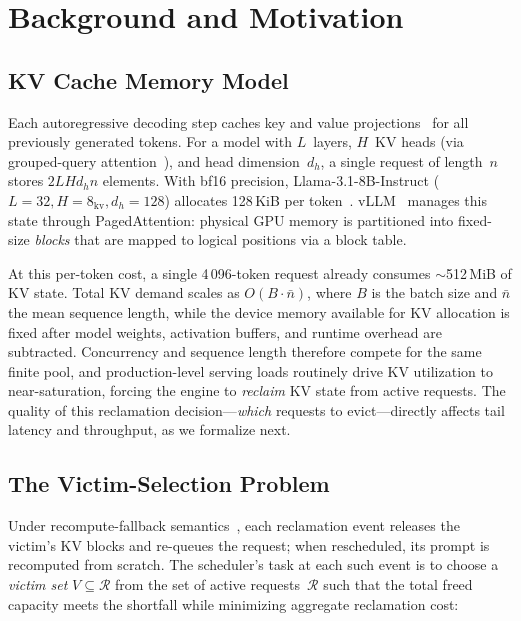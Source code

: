 \documentclass[sigconf,nonacm]{acmart}
\begin{document}
\section{Background and Motivation}\label{sec:background}

\subsection{KV Cache Memory Model}\label{sec:bg:kvcache}

Each autoregressive decoding step caches key and value
projections~\cite{Vaswani2017} for all previously generated tokens.  For a
model with $L$~layers, $H$~KV heads (via grouped-query
attention~\cite{Ainslie2023}), and head dimension~$d_h$, a single request of
length~$n$ stores $2LHd_h n$ elements.  With bf16 precision, Llama-3.1-8B-Instruct ($L{=}32,
H{=}8_{\text{kv}}, d_h{=}128$) allocates 128\,KiB per
token~\cite{Grattafiori2024}.  vLLM~\cite{Kwon2023} manages this state through
PagedAttention: physical GPU memory is partitioned into fixed-size \emph{blocks}
that are mapped to logical positions via a block table.

At this per-token cost, a single 4\,096-token request already consumes
$\sim$512\,MiB of KV state.  Total KV demand scales as $O(B \cdot \bar{n})$,
where $B$ is the batch size and $\bar{n}$ the mean sequence length, while the
device memory available for KV allocation is fixed after model weights, activation
buffers, and runtime overhead are subtracted.  Concurrency and sequence length
therefore compete for the same finite pool, and production-level serving loads
routinely drive KV utilization to near-saturation, forcing the engine to
\emph{reclaim} KV state from active requests.  The quality of this reclamation
decision---\emph{which} requests to evict---directly affects tail latency and
throughput, as we formalize next.

\subsection{The Victim-Selection Problem}\label{sec:bg:preemption}

Under recompute-fallback semantics~\cite{Kwon2023}, each reclamation event
releases the victim's KV blocks and re-queues the request; when rescheduled,
its prompt is recomputed from scratch.  The scheduler's task at each such event
is to choose a \emph{victim set} $V \subseteq \mathcal{R}$ from the set of
active requests~$\mathcal{R}$ such that the total freed capacity meets the
shortfall while minimizing aggregate reclamation cost:
\end{document}
